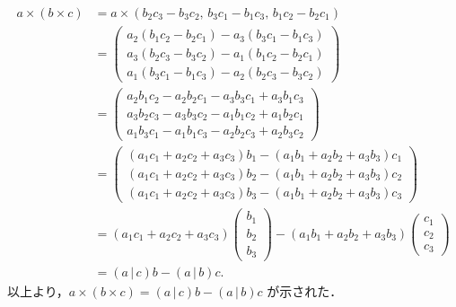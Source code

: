 \begin{tproof}
  \begin{align*}
    a \times (b \times c)
     & = a \times (b_2 c_3 - b_3 c_2, \, b_3 c_1 - b_1 c_3, \, b_1 c_2 - b_2 c_1)      \\
     & = \begin{pmatrix}
           a_2 (b_1 c_2 - b_2 c_1) - a_3 (b_3 c_1 - b_1 c_3) \\
           a_3 (b_2 c_3 - b_3 c_2) - a_1 (b_1 c_2 - b_2 c_1) \\
           a_1 (b_3 c_1 - b_1 c_3) - a_2 (b_2 c_3 - b_3 c_2)
         \end{pmatrix}                             \\
     & = \begin{pmatrix}
           a_2 b_1 c_2 - a_2 b_2 c_1 - a_3 b_3 c_1 + a_3 b_1 c_3 \\
           a_3 b_2 c_3 - a_3 b_3 c_2 - a_1 b_1 c_2 + a_1 b_2 c_1 \\
           a_1 b_3 c_1 - a_1 b_1 c_3 - a_2 b_2 c_3 + a_2 b_3 c_2
         \end{pmatrix}                         \\
     & = \begin{pmatrix}
           (a_1 c_1 + a_2 c_2 + a_3 c_3)b_1 - (a_1 b_1 + a_2 b_2 + a_3 b_3)c_1 \\
           (a_1 c_1 + a_2 c_2 + a_3 c_3)b_2 - (a_1 b_1 + a_2 b_2 + a_3 b_3)c_2 \\
           (a_1 c_1 + a_2 c_2 + a_3 c_3)b_3 - (a_1 b_1 + a_2 b_2 + a_3 b_3)c_3
         \end{pmatrix}           \\
     & = (a_1 c_1 + a_2 c_2 + a_3 c_3) \begin{pmatrix} b_1 \\ b_2 \\ b_3 \end{pmatrix}
    - (a_1 b_1 + a_2 b_2 + a_3 b_3) \begin{pmatrix} c_1 \\ c_2 \\ c_3 \end{pmatrix}    \\
     & = (a \,| \, c) b - (a \,| \, b) c.
  \end{align*}
  以上より，$a \times (b \times c) = (a \,| \, c) b - (a \,| \, b) c$ が示された．
\end{tproof}



